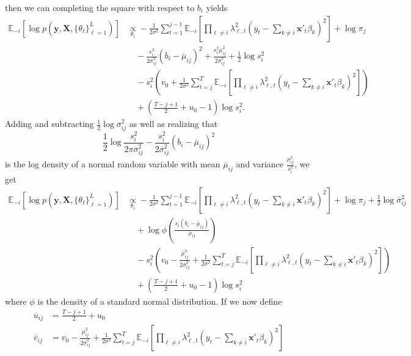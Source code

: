 \documentclass{article}
\newcommand{\E}{\mathbb{E}}
\begin{document}
then we can completing the square with respect to $b_i$ yields
\begin{align*}
    \E_{-i}\left[\log p\left(\mathbf{y}, \mathbf{X}, \{\theta_\ell\}_{\ell=1}^L\right)\right] &\underset{\theta_i}{\propto}  
    - \frac{1}{2\sigma^2} \sum_{t=1}^{j-1} \E_{-i}\left[\prod_{\ell \neq i} \lambda_{\ell,t}^2\left(y_t - \sum_{k\neq i} \mathbf{x}'_t\beta_k\right)^2\right] + \log \pi_j \\
    &\quad - \frac{s_i^2}{2\overline{\sigma}^2_{ij}} \left(b_i - \overline{\mu}_{ij}\right)^2 + \frac{s_i^2 \overline{\mu}_{ij}^2}{2\overline{\sigma}_{ij}^2} + \frac{1}{2} \log s_i^2 \\
    &\quad - s_i^2\left(v_0 + \frac{1}{2\sigma^2} \sum_{t=j}^{T} \E_{-i}\left[\prod_{\ell \neq i} \lambda_{\ell,t}^2\left(y_t - \sum_{k\neq i} \mathbf{x}'_t \beta_k\right)^2\right]\right)\\
    &\quad + \left(\frac{T - j + 1}{2} + u_0 - 1\right) \log s_i^2. 
\end{align*}
Adding and subtracting $\frac{1}{2}\log \overline{\sigma}^2_{ij}$ as well as realizing that $$\frac{1}{2}\log \frac{s_i^2}{2\pi\overline{\sigma}^2_{ij}}  - \frac{s_i^2}{2\overline{\sigma}^2_{ij}} \left(b_i - \overline{\mu}_{ij}\right)^2$$ is the log density of a normal random variable with mean $\overline{\mu}_{ij}$ and variance $\frac{\overline{\sigma}^2_{ij}}{s_i^2}$, we get
\begin{align*}
    \E_{-i}\left[\log p\left(\mathbf{y}, \mathbf{X}, \{\theta_\ell\}_{\ell=1}^L\right)\right] &\underset{\theta_i}{\propto}
    - \frac{1}{2\sigma^2} \sum_{t=1}^{j-1} \E_{-i}\left[\prod_{\ell \neq i} \lambda_{\ell,t}^2\left(y_t - \sum_{k\neq i} \mathbf{x}'_t\beta_k\right)^2\right] + \log \pi_j + \frac{1}{2} \log \overline{\sigma}_{ij}^2 \\
    &\quad +  \log \phi\left( \frac{s_i(b_i - \overline{\mu}_{ij})}{\overline{\sigma}_{ij}}\right) \\
    &\quad - s_i^2\left(v_0 - \frac{\overline{\mu}_{ij}^2}{2\overline{\sigma}_{ij}^2} + \frac{1}{2\sigma^2} \sum_{t=j}^{T} \E_{-i}\left[\prod_{\ell \neq i} \lambda_{\ell,t}^2\left(y_t - \sum_{k\neq i} \mathbf{x}'_t \beta_k\right)^2\right]\right)\\
    &\quad + \left(\frac{T - j + 1}{2} + u_0 - 1\right) \log s_i^2  
\end{align*}
where $\phi$ is the density of a standard normal distribution. If we now define 
\begin{align*}
    \overline{u}_{ij} &= \frac{T - j + 1}{2} + u_0 \\
    \overline{v}_{ij} &= v_0 - \frac{\overline{\mu}_{ij}^2}{2\overline{\sigma}_{ij}^2} + \frac{1}{2\sigma^2} \sum_{t=j}^{T} \E_{-i}\left[\prod_{\ell \neq i} \lambda_{\ell,t}^2\left(y_t - \sum_{k\neq i} \mathbf{x}'_t \beta_k\right)^2\right]
\end{align*}
\end{document}
